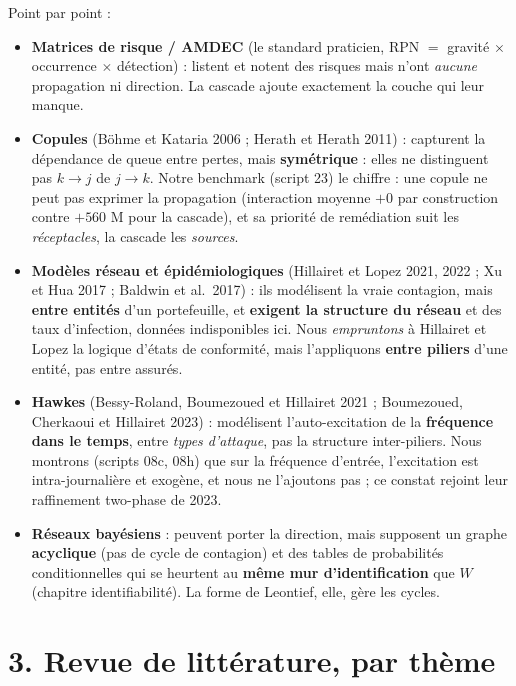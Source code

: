 \documentclass[11pt,a4paper]{article}
\providecommand{\euro}{\texteuro}
\begin{document}
\vspace{2pt}
Point par point :
\begin{itemize}\itemsep2pt
\item \textbf{Matrices de risque / AMDEC} (le standard praticien, RPN $=$ gravité $\times$
      occurrence $\times$ détection) : listent et notent des risques mais n'ont \emph{aucune}
      propagation ni direction. La cascade ajoute exactement la couche qui leur manque.
\item \textbf{Copules} (Böhme et Kataria 2006 ; Herath et Herath 2011) : capturent la
      dépendance de queue entre pertes, mais \textbf{symétrique} : elles ne distinguent pas
      $k\to j$ de $j\to k$. Notre benchmark (script 23) le chiffre : une copule ne peut pas
      exprimer la propagation (interaction moyenne $+0$ par construction contre $+560$ M\euro{}
      pour la cascade), et sa priorité de remédiation suit les \emph{réceptacles}, la cascade
      les \emph{sources}.
\item \textbf{Modèles réseau et épidémiologiques} (Hillairet et Lopez 2021, 2022 ; Xu et Hua
      2017 ; Baldwin et al.\ 2017) : ils modélisent la vraie contagion, mais \textbf{entre
      entités} d'un portefeuille, et \textbf{exigent la structure du réseau} et des taux
      d'infection, données indisponibles ici. Nous \emph{empruntons} à Hillairet et Lopez la
      logique d'états de conformité, mais l'appliquons \textbf{entre piliers} d'une entité,
      pas entre assurés.
\item \textbf{Hawkes} (Bessy-Roland, Boumezoued et Hillairet 2021 ; Boumezoued, Cherkaoui et
      Hillairet 2023) : modélisent l'auto-excitation de la \textbf{fréquence dans le temps},
      entre \emph{types d'attaque}, pas la structure inter-piliers. Nous montrons (scripts
      08c, 08h) que sur la fréquence d'entrée, l'excitation est intra-journalière et exogène,
      et nous ne l'ajoutons pas ; ce constat rejoint leur raffinement two-phase de 2023.
\item \textbf{Réseaux bayésiens} : peuvent porter la direction, mais supposent un graphe
      \textbf{acyclique} (pas de cycle de contagion) et des tables de probabilités
      conditionnelles qui se heurtent au \textbf{même mur d'identification} que $W$ (chapitre
      identifiabilité). La forme de Leontief, elle, gère les cycles.
\end{itemize}

\section*{3. Revue de littérature, par thème}
\end{document}
